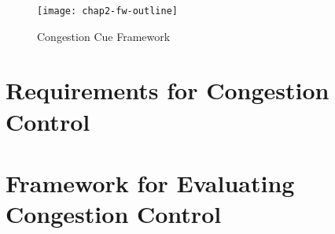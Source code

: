 \begin{figure}[!h]
\texttt{[image: chap2-fw-outline]}
\caption{Congestion Cue Framework}
\label{fig:4:fw}
\end{figure}


\section{Requirements for Congestion Control}
\label{fw.cc.req}

\section{Framework for Evaluating Congestion Control}
\label{fw.cc.eval}

